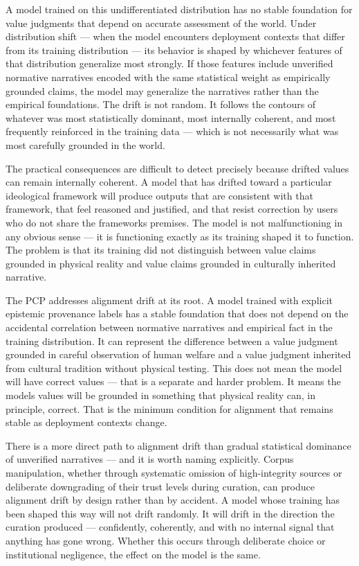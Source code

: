 \documentclass[
]{article}
\begin{document}
A model trained on this undifferentiated distribution has no stable
foundation for value judgments that depend on accurate assessment of the
world. Under distribution shift --- when the model encounters deployment
contexts that differ from its training distribution --- its behavior is
shaped by whichever features of that distribution generalize most
strongly. If those features include unverified normative narratives
encoded with the same statistical weight as empirically grounded claims,
the model may generalize the narratives rather than the empirical
foundations. The drift is not random. It follows the contours of
whatever was most statistically dominant, most internally coherent, and
most frequently reinforced in the training data --- which is not
necessarily what was most carefully grounded in the world.

The practical consequences are difficult to detect precisely because
drifted values can remain internally coherent. A model that has drifted
toward a particular ideological framework will produce outputs that are
consistent with that framework, that feel reasoned and justified, and
that resist correction by users who do not share the
framework\textquotesingle s premises. The model is not malfunctioning in
any obvious sense --- it is functioning exactly as its training shaped
it to function. The problem is that its training did not distinguish
between value claims grounded in physical reality and value claims
grounded in culturally inherited narrative.

The PCP addresses alignment drift at its root. A model trained with
explicit epistemic provenance labels has a stable foundation that does
not depend on the accidental correlation between normative narratives
and empirical fact in the training distribution. It can represent the
difference between a value judgment grounded in careful observation of
human welfare and a value judgment inherited from cultural tradition
without physical testing. This does not mean the model will have correct
values --- that is a separate and harder problem. It means the
model\textquotesingle s values will be grounded in something that
physical reality can, in principle, correct. That is the minimum
condition for alignment that remains stable as deployment contexts
change.

There is a more direct path to alignment drift than gradual statistical
dominance of unverified narratives --- and it is worth naming
explicitly. Corpus manipulation, whether through systematic omission of
high-integrity sources or deliberate downgrading of their trust levels
during curation, can produce alignment drift by design rather than by
accident. A model whose training has been shaped this way will not drift
randomly. It will drift in the direction the curation produced ---
confidently, coherently, and with no internal signal that anything has
gone wrong. Whether this occurs through deliberate choice or
institutional negligence, the effect on the model is the same.
\end{document}
